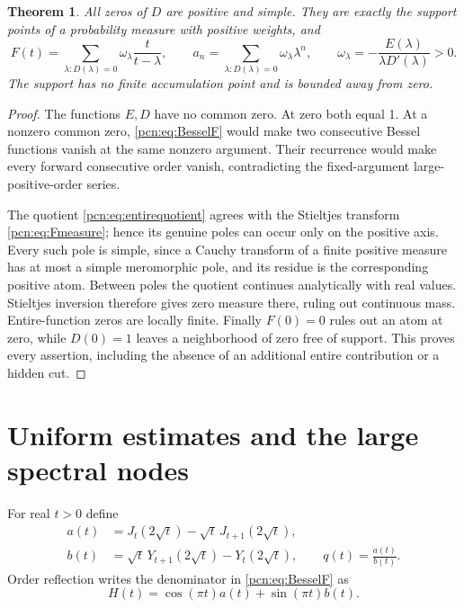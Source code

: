\documentclass[11pt,letterpaper]{article}
\newtheorem{theorem}{Theorem}[section]
\theoremstyle{remark}\newtheorem{remark}[theorem]{Remark}
\begin{document}
\begin{theorem}\label{pcn:thm:spectrum}
All zeros of $D$ are positive and simple. They are exactly the support points of a probability measure with positive weights, and
\begin{equation}\label{pcn:eq:spectrum}
 F(t)=\sum_{\lambda:D(\lambda)=0}\omega_\lambda\frac{t}{t-\lambda},
 \qquad
 a_n=\sum_{\lambda:D(\lambda)=0}\omega_\lambda\lambda^n,
 \qquad
 \omega_\lambda=-\frac{E(\lambda)}{\lambda D'(\lambda)}>0.
\end{equation}
The support has no finite accumulation point and is bounded away from zero.
\end{theorem}
\begin{proof}
The functions $E,D$ have no common zero. At zero both equal 1. At a nonzero common zero, \eqref{pcn:eq:BesselF} would make two consecutive Bessel functions vanish at the same nonzero argument. Their recurrence would make every forward consecutive order vanish, contradicting the fixed-argument large-positive-order series.

The quotient \eqref{pcn:eq:entirequotient} agrees with the Stieltjes transform \eqref{pcn:eq:Fmeasure}; hence its genuine poles can occur only on the positive axis. Every such pole is simple, since a Cauchy transform of a finite positive measure has at most a simple meromorphic pole, and its residue is the corresponding positive atom. Between poles the quotient continues analytically with real values. Stieltjes inversion therefore gives zero measure there, ruling out continuous mass. Entire-function zeros are locally finite. Finally $F(0)=0$ rules out an atom at zero, while $D(0)=1$ leaves a neighborhood of zero free of support. This proves every assertion, including the absence of an additional entire contribution or a hidden cut.
\end{proof}

\section{Uniform estimates and the large spectral nodes}
For real $t>0$ define
\begin{align}
 a(t)&=J_t(2\sqrt t)-\sqrt t\,J_{t+1}(2\sqrt t),\label{pcn:eq:ab}\\
 b(t)&=\sqrt t\,Y_{t+1}(2\sqrt t)-Y_t(2\sqrt t),\qquad q(t)=\frac{a(t)}{b(t)}.
\end{align}
Order reflection \cite[\S10.4]{DLMF} writes the denominator in \eqref{pcn:eq:BesselF} as
\begin{equation}\label{pcn:eq:H}
 H(t)=\cos(\pi t)a(t)+\sin(\pi t)b(t).
\end{equation}
\end{document}

